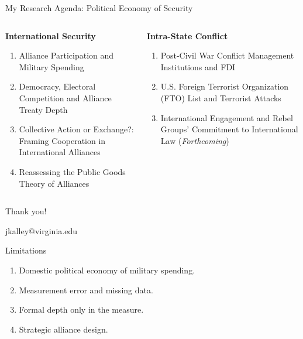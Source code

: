 \documentclass[12pt]{beamer}
\begin{document}
\begin{frame}{My Research Agenda: Political Economy of Security}

\begin{columns}

\begin{column}{0.5\textwidth}
\textbf{International Security}
\begin{enumerate} 
\item Alliance Participation and Military Spending 
\item Democracy, Electoral Competition and Alliance Treaty Depth
\item Collective Action or Exchange?: Framing Cooperation in International Alliances 
\item Reassessing the Public Goods Theory of Alliances
\end{enumerate} 
\end{column}



\begin{column}{0.5\textwidth}
\textbf{Intra-State Conflict}
\begin{enumerate}
\item Post-Civil War Conflict Management Institutions and FDI 
\item U.S. Foreign Terrorist Organization (FTO) List and Terrorist Attacks
\item International Engagement and Rebel Groups’ Commitment to International Law  (\textit{Forthcoming})
\end{enumerate} 
\end{column}

\end{columns}
 

\end{frame}



 \begin{frame}[standout]

Thank you! 

jkalley@virginia.edu

 \end{frame}



\appendix 



\begin{frame}{Limitations}

\begin{enumerate}
\item Domestic political economy of military spending. 
\item Measurement error and missing data. 
\item Formal depth only in the measure. 
\item Strategic alliance design. 
\end{enumerate}

\end{frame}
\end{document}

